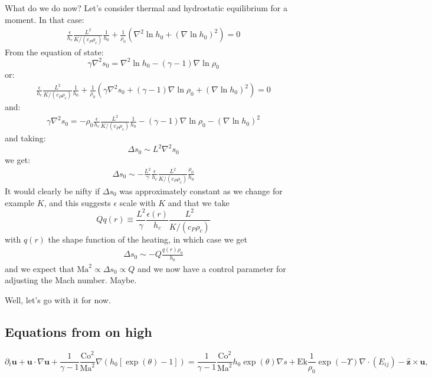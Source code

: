 \documentclass{aastex62}
\newcommand{\del}{\nabla}
\renewcommand{\vec}{\boldsymbol}
\begin{document}
What do we do now?  Let's consider thermal and hydrostatic equilibrium for a moment.  In that case:
\begin{align}
\frac{\epsilon}{h_c} \frac{L^2}{K/(c_P \rho_c)}\frac{1}{h_0} +  \frac{1}{\rho_0} \left(\nabla^2 \ln h_0 + (\nabla \ln h_0)^2 \right) = 0
\end{align}
From the equation of state:
\begin{equation}
  \gamma \nabla^2 s_0 = \nabla^2 \ln h_0 - (\gamma-1)\nabla \ln \rho_0
\end{equation}
or:
\begin{align}
\frac{\epsilon}{h_c} \frac{L^2}{K/(c_P \rho_c)}\frac{1}{h_0} +  \frac{1}{\rho_0} \left(\gamma \nabla^2 s_0 + (\gamma-1)\nabla \ln \rho_0 + (\nabla \ln h_0)^2 \right) = 0
\end{align}
and:
\begin{align}
 \gamma \nabla^2 s_0 = - \rho_0 \frac{\epsilon}{h_c} \frac{L^2}{K/(c_P \rho_c)}\frac{1}{h_0} - (\gamma-1)\nabla \ln \rho_0 - (\nabla \ln h_0)^2
\end{align}
and taking:
\begin{equation}
  \Delta s_0 \sim L^2 \nabla^2 s_0
\end{equation}
we get:
\begin{align}
 \Delta s_0 \sim - \frac{L^2}{\gamma} \frac{\epsilon}{h_c} \frac{L^2}{K/(c_P \rho_c)}\frac{\rho_0}{h_0}
\end{align}
It would clearly be nifty if $\Delta s_0$ was approximately constant as we change for example $K$, and this suggests $\epsilon$ scale with $K$ and that we take
\begin{equation}
Q q(r)\equiv \frac{L^2}{\gamma} \frac{\epsilon(r)}{h_c} \frac{L^2}{K/(c_P \rho_c)}
\end{equation}
with $q(r)$ the shape function of the heating,
in which case we get
\begin{align}
 \Delta s_0 \sim - Q\frac{q(r) \rho_0}{h_0}
\end{align}
and we expect that $\mathrm{Ma}^2 \propto \Delta s_0 \propto Q$ and we now have a control parameter for adjusting the Mach number.  Maybe.

Well, let's go with it for now.

\subsection{Equations from on high}

\begin{equation}
  \partial_t \vec{u} + \vec{u}\cdot \del \vec{u} + \frac{1}{\gamma-1}\frac{\mathrm{Co}^2}{\mathrm{Ma}^{2}}\del (h_0[\exp(\theta)-1]) =
  \frac{1}{\gamma-1}\frac{\mathrm{Co}^2}{\mathrm{Ma}^{2}} h_0\exp(\theta)\del s
  + \mathrm{Ek}\frac{1}{\rho_0}\exp(-\Upsilon)\del\cdot (E_{ij}) - \vec{\hat{z}} \times \vec{u},
\end{equation}
\end{document}
